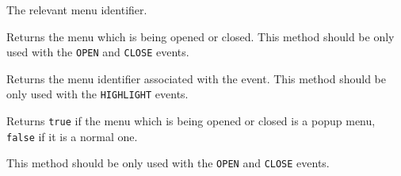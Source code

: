 
The relevant menu identifier.


\label{wxmenueventgetmenu}


Returns the menu which is being opened or closed. This method should be only
used with the \texttt{OPEN} and \texttt{CLOSE} events.


\label{wxmenueventgetmenuid}


Returns the menu identifier associated with the event. This method should be
only used with the {\tt HIGHLIGHT} events.


\label{wxmenueventispopup}


Returns {\tt true} if the menu which is being opened or closed is a popup menu, 
{\tt false} if it is a normal one.

This method should be only used with the {\tt OPEN} and {\tt CLOSE} events.


